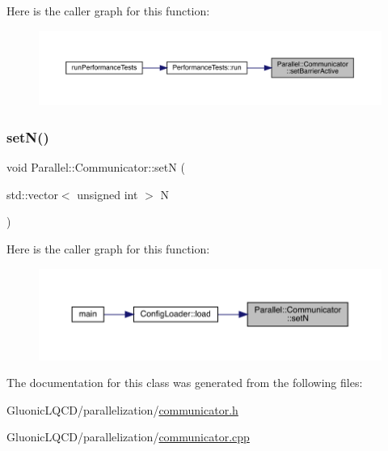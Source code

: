 Here is the caller graph for this function\+:\nopagebreak
\begin{figure}[H]
\begin{center}
\leavevmode
\includegraphics[width=350pt]{class_parallel_1_1_communicator_a13263be32405fa088f06b07f7fdfe281_icgraph}
\end{center}
\end{figure}
\mbox{\label{class_parallel_1_1_communicator_aea1c6e1ff8f4f40d3db0ac8e0b29db62}} 
\subsubsection{\texorpdfstring{setN()}{setN()}}
{\footnotesize\ttfamily void Parallel\+::\+Communicator\+::setN (\begin{DoxyParamCaption}\item[{std\+::vector$<$ unsigned int $>$}]{N }\end{DoxyParamCaption})\hspace{0.3cm}{\ttfamily [static]}}

Here is the caller graph for this function\+:
\nopagebreak
\begin{figure}[H]
\begin{center}
\leavevmode
\includegraphics[width=350pt]{class_parallel_1_1_communicator_aea1c6e1ff8f4f40d3db0ac8e0b29db62_icgraph}
\end{center}
\end{figure}


The documentation for this class was generated from the following files\+:\begin{DoxyCompactItemize}
\item 
Gluonic\+L\+Q\+C\+D/parallelization/\mbox{\hyperlink{communicator_8h}{communicator.\+h}}\item 
Gluonic\+L\+Q\+C\+D/parallelization/\mbox{\hyperlink{communicator_8cpp}{communicator.\+cpp}}\end{DoxyCompactItemize}
